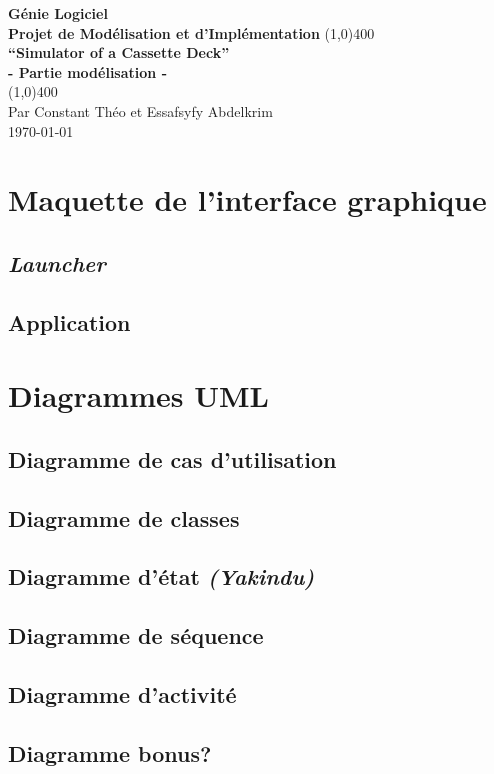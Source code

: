\documentclass[11pt]{article}
\begin{document}
\begin{titlepage}
\begin{center}
\vspace*{1cm}
\Large{\textbf{Génie Logiciel}}\\
\Large{\textbf{Projet de Modélisation et d’Implémentation}}
\vfill
\line(1,0){400}\\[1mm]
\huge{\textbf{“Simulator of a Cassette Deck”}}\\[3mm]
\Large{\textbf{- Partie modélisation -}}\\[1mm]
\line(1,0){400}\\
\vfill
Par Constant Théo et Essafsyfy Abdelkrim\\
\today
\end{center}
\end{titlepage}

\tableofcontents
\thispagestyle{empty} %
\clearpage %

\setcounter{page}{1} %

\section{Maquette de l'interface graphique}
\subsection{\textit{Launcher}}
\subsection{Application}
\section{Diagrammes UML}
\subsection{Diagramme de cas d'utilisation}
\subsection{Diagramme de classes}
\subsection{Diagramme d'état \textit{(Yakindu)}}
\subsection{Diagramme de séquence}
\subsection{Diagramme d'activité}
\subsection{Diagramme bonus?}
\end{document}
